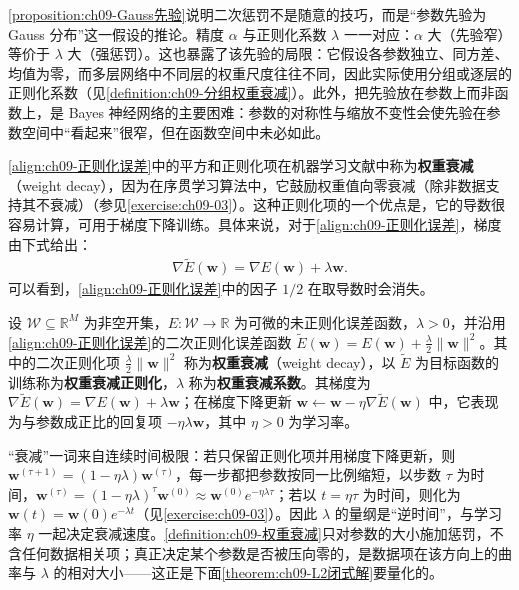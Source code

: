 \documentclass[../../main.tex]{subfiles}
\begin{document}
\begin{remark}\cref{proposition:ch09-Gauss先验}说明二次惩罚不是随意的技巧，而是“参数先验为 Gauss 分布”这一假设的推论。精度 $\alpha$ 与正则化系数 $\lambda$ 一一对应：$\alpha$ 大（先验窄）等价于 $\lambda$ 大（强惩罚）。这也暴露了该先验的局限：它假设各参数独立、同方差、均值为零，而多层网络中不同层的权重尺度往往不同，因此实际使用分组或逐层的正则化系数（见\cref{definition:ch09-分组权重衰减}）。此外，把先验放在参数上而非函数上，是 Bayes 神经网络的主要困难：参数的对称性与缩放不变性会使先验在参数空间中“看起来”很窄，但在函数空间中未必如此。
\end{remark}

\eqref{align:ch09-正则化误差}中的平方和正则化项在机器学习文献中称为\textbf{权重衰减}（weight decay），因为在序贯学习算法中，它鼓励权重值向零衰减（除非数据支持其不衰减）（参见\cref{exercise:ch09-03}）。这种正则化项的一个优点是，它的导数很容易计算，可用于梯度下降训练。具体来说，对于\eqref{align:ch09-正则化误差}，梯度由下式给出：
\begin{align}
\nabla\widetilde{E}(\boldsymbol{w})=\nabla E(\boldsymbol{w})+\lambda\boldsymbol{w}.
\label{align:ch09-权重衰减梯度}
\end{align}
可以看到，\eqref{align:ch09-正则化误差}中的因子 $1/2$ 在取导数时会消失。

\begin{definition}[权重衰减]\label{definition:ch09-权重衰减}
设 $\mathcal{W}\subseteq\mathbb{R}^{M}$ 为非空开集，$E:\mathcal{W}\to\mathbb{R}$ 为可微的未正则化误差函数，$\lambda>0$，并沿用\eqref{align:ch09-正则化误差}的二次正则化误差函数 $\widetilde{E}(\boldsymbol{w})=E(\boldsymbol{w})+\frac{\lambda}{2}\|\boldsymbol{w}\|^{2}$。其中的二次正则化项 $\frac{\lambda}{2}\|\boldsymbol{w}\|^{2}$ 称为\textbf{权重衰减}（weight decay），以 $\widetilde{E}$ 为目标函数的训练称为\textbf{权重衰减正则化}，$\lambda$ 称为\textbf{权重衰减系数}。其梯度为 $\nabla\widetilde{E}(\boldsymbol{w})=\nabla E(\boldsymbol{w})+\lambda\boldsymbol{w}$；在梯度下降更新 $\boldsymbol{w}\leftarrow\boldsymbol{w}-\eta\nabla\widetilde{E}(\boldsymbol{w})$ 中，它表现为与参数成正比的回复项 $-\eta\lambda\boldsymbol{w}$，其中 $\eta>0$ 为学习率。
\end{definition}

\begin{remark}“衰减”一词来自连续时间极限：若只保留正则化项并用梯度下降更新，则 $\boldsymbol{w}^{(\tau+1)}=(1-\eta\lambda)\boldsymbol{w}^{(\tau)}$，每一步都把参数按同一比例缩短，以步数 $\tau$ 为时间，$\boldsymbol{w}^{(\tau)}=(1-\eta\lambda)^{\tau}\boldsymbol{w}^{(0)}\approx\boldsymbol{w}^{(0)}e^{-\eta\lambda\tau}$；若以 $t=\eta\tau$ 为时间，则化为 $\boldsymbol{w}(t)=\boldsymbol{w}(0)e^{-\lambda t}$（见\cref{exercise:ch09-03}）。因此 $\lambda$ 的量纲是“逆时间”，与学习率 $\eta$ 一起决定衰减速度。\cref{definition:ch09-权重衰减}只对参数的大小施加惩罚，不含任何数据相关项；真正决定某个参数是否被压向零的，是数据项在该方向上的曲率与 $\lambda$ 的相对大小——这正是下面\cref{theorem:ch09-L2闭式解}要量化的。
\end{remark}
\end{document}
